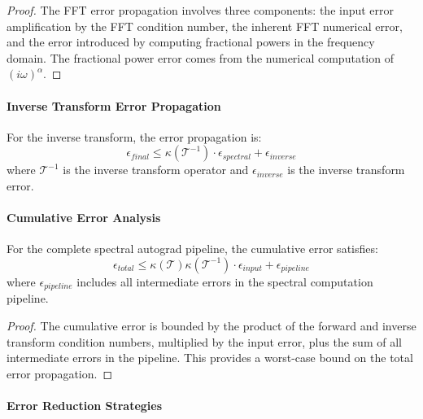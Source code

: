 \begin{proof}
The FFT error propagation involves three components: the input error amplification by the FFT condition number, the inherent FFT numerical error, and the error introduced by computing fractional powers in the frequency domain. The fractional power error comes from the numerical computation of $(i\omega)^{\alpha}$.
\end{proof}

\paragraph{Inverse Transform Error Propagation}

\begin{theorem}
For the inverse transform, the error propagation is:
\begin{equation}
\epsilon_{final} \leq \kappa(\mathcal{T}^{-1}) \cdot \epsilon_{spectral} + \epsilon_{inverse}
\end{equation}
where $\mathcal{T}^{-1}$ is the inverse transform operator and $\epsilon_{inverse}$ is the inverse transform error.
\end{theorem}

\paragraph{Cumulative Error Analysis}

\begin{theorem}
For the complete spectral autograd pipeline, the cumulative error satisfies:
\begin{equation}
\epsilon_{total} \leq \kappa(\mathcal{T}) \kappa(\mathcal{T}^{-1}) \cdot \epsilon_{input} + \epsilon_{pipeline}
\end{equation}
where $\epsilon_{pipeline}$ includes all intermediate errors in the spectral computation pipeline.
\end{theorem}

\begin{proof}
The cumulative error is bounded by the product of the forward and inverse transform condition numbers, multiplied by the input error, plus the sum of all intermediate errors in the pipeline. This provides a worst-case bound on the total error propagation.
\end{proof}

\paragraph{Error Reduction Strategies}

